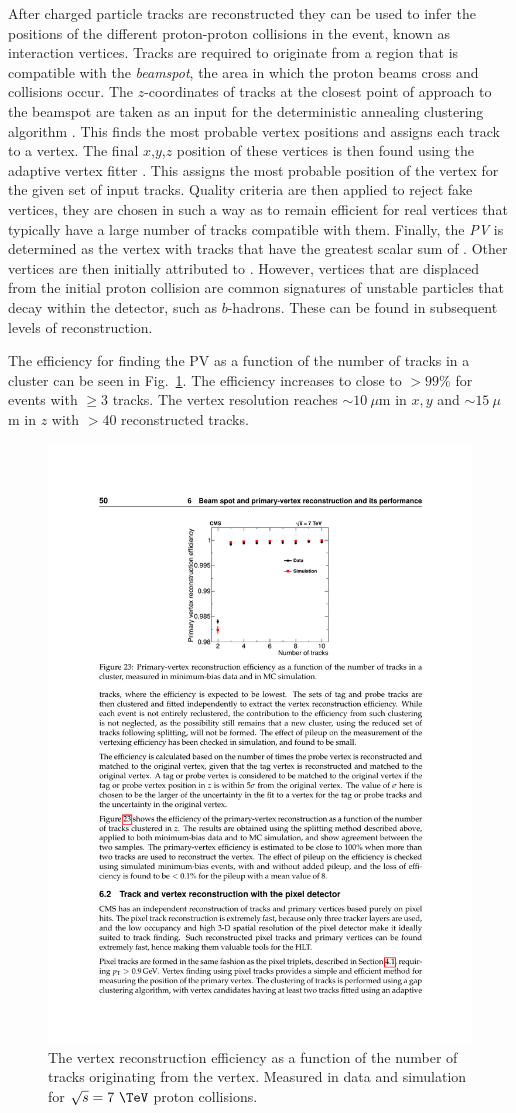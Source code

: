 After charged particle tracks are reconstructed they can be used to
infer the positions of the different proton-proton collisions in the
event, known as interaction vertices. Tracks are required to originate
from a region that is compatible with the \LHC \emph{beamspot}, the area
in which the proton beams cross and collisions occur. The
$z$-coordinates of tracks at the closest point of approach to the
beamspot are taken as an input for the deterministic annealing
clustering algorithm \cite{726788:DA}. This finds the most probable
vertex positions and assigns each track to a vertex. The final
$x$,$y$,$z$ position of these vertices is then found using the
adaptive vertex fitter \cite{Waltenberger:2008zz}. This assigns the
most probable position of the vertex for the given set of input
tracks. Quality criteria are then applied to reject fake vertices,
they are chosen in such a way as to remain efficient for real vertices
that typically have a large number of tracks compatible with them.
Finally, the \emph{\ac{PV}} is determined as the vertex with
tracks that have the greatest scalar sum of \pt. Other vertices are
then initially attributed to \PU.  However, vertices that are
displaced from the initial proton collision are common signatures of
unstable particles that decay within the detector, such as
$b$-hadrons. These can be found in subsequent levels of
reconstruction.

The efficiency for finding the \ac{PV} as a function of the
number of tracks in a cluster can be seen in
Fig.~\ref{fig:vertex_reco}. The efficiency increases to close to
$>99\%$ for events with $\ge 3$ tracks. The vertex resolution reaches
$\sim10~\mu$m in $x,y$ and $\sim15~\mu$m in $z$ with $>40$
reconstructed tracks.

\begin{figure}
\begin{center}
\includegraphics[width=0.5\linewidth]{figs/reconstruction/vertexPerformance} \end{center}
\caption{ The vertex reconstruction efficiency as a function of the
number of tracks originating from the vertex. Measured in data and
simulation for $\sqrt{s}=7~\tev$ proton collisions.
\cite{Chatrchyan:2014fea}}
\label{fig:vertex_reco} \end{figure}



